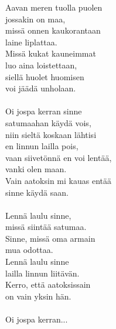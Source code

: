 
Aavan meren tuolla puolen \\ jossakin on maa, \\ missä onnen kaukorantaan \\ laine liplattaa. \\ Missä kukat kauneimmat \\ luo aina loistettaan, \\ siellä huolet huomisen \\ voi jäädä unholaan. \\ \hspace{10mm} \\ Oi jospa kerran sinne \\ satumaahan käydä vois, \\ niin sieltä koskaan lähtisi \\ en linnun lailla pois, \\ vaan siivetönnä en voi lentää, \\ vanki olen maan. \\ Vain aatoksin mi kauas entää \\ sinne käydä saan. \\ \hspace{10mm} \\ Lennä laulu sinne, \\ missä siintää satumaa. \\ Sinne, missä oma armain \\ mua odottaa. \\ Lennä laulu sinne \\ lailla linnun liitävän. \\ Kerro, että aatoksissain \\ on vain yksin hän. \\ \hspace{10mm} \\ Oi jospa kerran...